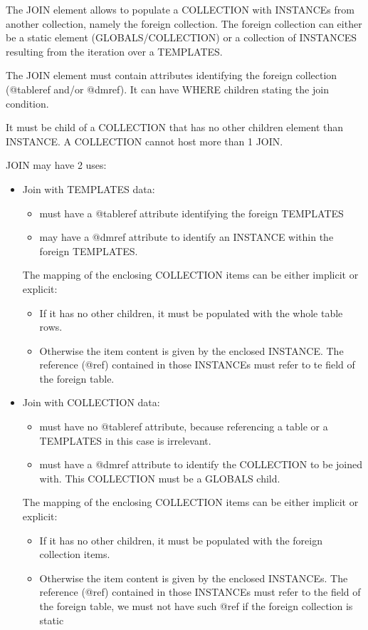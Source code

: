 The JOIN element allows to populate a COLLECTION with INSTANCEs from another collection, namely the foreign collection.
The foreign collection can either be a static element (GLOBALS/COLLECTION) or a collection of INSTANCES resulting from the iteration over a TEMPLATES.

The JOIN element must contain attributes identifying the foreign collection  (@tableref and/or @dmref). 
It can have WHERE children stating the join condition.

It must be child of a COLLECTION that has no other children element than INSTANCE. A COLLECTION cannot host more than 1 JOIN.

JOIN may have 2 uses:

\begin{itemize}

  \item Join with TEMPLATES data:
       \begin{itemize}
         \item must have a @tableref attribute identifying the foreign TEMPLATES
         \item may have a @dmref attribute to identify an INSTANCE within the foreign TEMPLATES.
       \end{itemize}
       The mapping of the enclosing COLLECTION items can be either implicit or explicit:
       \begin{itemize}
         \item If it has no other children, it must be populated with the whole table rows.
         \item Otherwise the item content is given by the enclosed INSTANCE. 
                 The reference (@ref) contained in those INSTANCEs must refer to te field of the foreign table.
       \end{itemize}
       
  \item Join with COLLECTION data:
       \begin{itemize}
         \item must have no @tableref attribute, because referencing a table or a TEMPLATES in this case is irrelevant.
         \item must have a @dmref attribute to identify the COLLECTION to be joined with. This COLLECTION must be a GLOBALS child.
       \end{itemize}
       The mapping of the enclosing COLLECTION items can be either implicit or explicit:
       \begin{itemize}
         \item If it has no other children, it must be populated with the foreign collection items.
         \item Otherwise the item content is given by the enclosed INSTANCEs. The reference (@ref) contained in those INSTANCEs must refer to the field of the foreign table, we must not have such @ref if the foreign collection is static
       \end{itemize}
           
\end{itemize}

